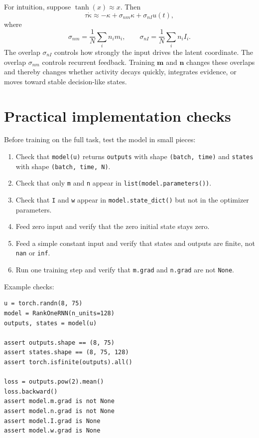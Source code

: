 \documentclass[11pt]{article}
\newcommand{\vm}{\mathbf{m}}
\newcommand{\vn}{\mathbf{n}}
\begin{document}
For intuition, suppose $\tanh(x) \approx x$. Then
\[
  \tau \dot{\kappa}
  \approx
  -\kappa
  +
  \sigma_{nm}\kappa
  +
  \sigma_{nI}u(t),
\]
where
\[
  \sigma_{nm} = \frac{1}{N}\sum_i n_i m_i,
  \qquad
  \sigma_{nI} = \frac{1}{N}\sum_i n_i I_i.
\]
The overlap $\sigma_{nI}$ controls how strongly the input drives the latent
coordinate. The overlap $\sigma_{nm}$ controls recurrent feedback. Training
$\vm$ and $\vn$ changes these overlaps and thereby changes whether activity
decays quickly, integrates evidence, or moves toward stable decision-like states.

\section{Practical implementation checks}

Before training on the full task, test the model in small pieces:
\begin{enumerate}
  \item Check that \texttt{model(u)} returns \texttt{outputs} with shape
  \texttt{(batch, time)} and \texttt{states} with shape
  \texttt{(batch, time, N)}.
  \item Check that only \texttt{m} and \texttt{n} appear in
  \texttt{list(model.parameters())}.
  \item Check that \texttt{I} and \texttt{w} appear in
  \texttt{model.state\_dict()} but not in the optimizer parameters.
  \item Feed zero input and verify that the zero initial state stays zero.
  \item Feed a simple constant input and verify that states and outputs are
  finite, not \texttt{nan} or \texttt{inf}.
  \item Run one training step and verify that \texttt{m.grad} and
  \texttt{n.grad} are not \texttt{None}.
\end{enumerate}

Example checks:
\begin{lstlisting}[style=python]
u = torch.randn(8, 75)
model = RankOneRNN(n_units=128)
outputs, states = model(u)

assert outputs.shape == (8, 75)
assert states.shape == (8, 75, 128)
assert torch.isfinite(outputs).all()

loss = outputs.pow(2).mean()
loss.backward()
assert model.m.grad is not None
assert model.n.grad is not None
assert model.I.grad is None
assert model.w.grad is None
\end{lstlisting}
\end{document}
